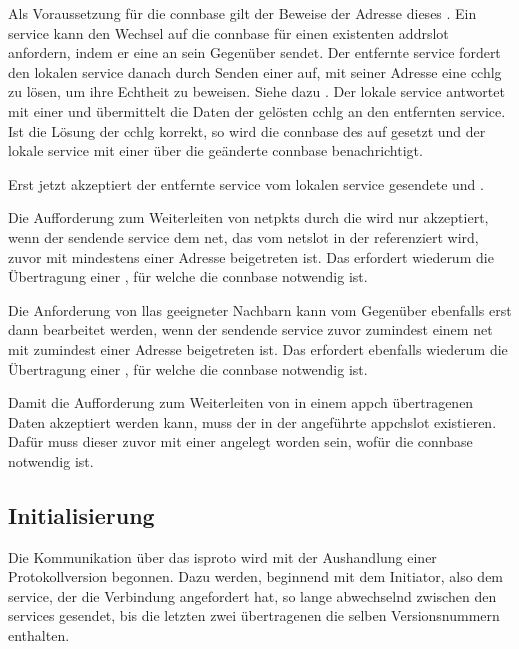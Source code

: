 Als Voraussetzung für die \gls{connbase}  gilt der Beweise der Adresse dieses
. Ein \gls{service} kann den Wechsel auf die \gls{connbase}
 für einen existenten \gls{addrslot} anfordern, indem er eine \msg{\isprotots}
an sein Gegenüber sendet.
Der entfernte \gls{service} fordert den lokalen \gls{service} danach durch Senden einer
\msg{\isprotoccreq} auf, mit seiner Adresse eine \gls{cchlg} zu lösen, um ihre Echtheit zu
beweisen. Siehe dazu .
Der lokale \gls{service} antwortet mit einer \msg{\isprotoccrep} und übermittelt die Daten der
gelösten \gls{cchlg} an den entfernten \gls{service}.
Ist die Lösung der \gls{cchlg} korrekt, so wird die \gls{connbase} des
 auf  gesetzt und der lokale \gls{service} mit
einer \msg{\isprotocbn} über die geänderte \gls{connbase} benachrichtigt.

Erst jetzt akzeptiert der entfernte \gls{service} vom lokalen \gls{service} gesendete
\msgpl{\isprotonjn} und \msgpl{\isprotonln}.

Die Aufforderung zum Weiterleiten von \glspl{netpkt} durch die \msg{\isprotonp} wird nur
akzeptiert, wenn der sendende \gls{service} dem \gls{net}, das vom \gls{netslot} in der
\msg{\isprotonp} referenziert wird, zuvor mit mindestens einer Adresse beigetreten ist.
Das erfordert wiederum die Übertragung einer \msg{\isprotonjn}, für welche die \gls{connbase}
 notwendig ist.

Die Anforderung von \glspl{lla} geeigneter Nachbarn kann vom Gegenüber ebenfalls erst dann
bearbeitet werden, wenn der sendende \gls{service} zuvor zumindest einem \gls{net} mit zumindest
einer Adresse beigetreten ist.
Das erfordert ebenfalls wiederum die Übertragung einer \msg{\isprotonjn}, für welche die
\gls{connbase}  notwendig ist.

Damit die Aufforderung zum Weiterleiten von in einem \gls{appch} übertragenen Daten akzeptiert
werden kann, muss der in der \msg{\isprotoacd} angeführte \gls{appchslot} existieren. Dafür
muss dieser zuvor mit einer \msg{\isprotoacsa} angelegt worden sein, wofür die \gls{connbase}
 notwendig ist.

\subsection{Initialisierung}
Die Kommunikation über das \gls{isproto} wird mit der Aushandlung einer Protokollversion begonnen.
Dazu werden, beginnend mit dem Initiator, also dem \gls{service}, der die Verbindung angefordert hat,
so lange \msgpl{\isprotoversion} abwechselnd zwischen den \glspl{service} gesendet, bis die letzten
zwei übertragenen \msgpl{\isprotoversion} die selben Versionsnummern enthalten.

